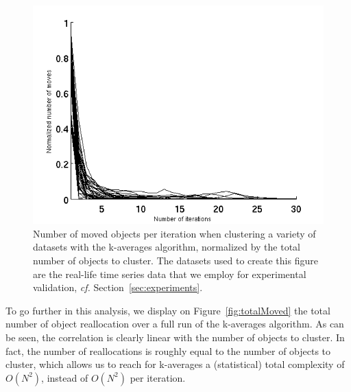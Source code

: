 \documentclass[10pt,journal,compsoc]{IEEEtran}
\begin{document}
\begin{figure}
\center
\includegraphics[width = \columnwidth]{figures/iterMove.png} 
\caption{Number of moved objects per iteration when clustering a variety of datasets with the k-averages algorithm, normalized by the total number of objects to cluster. The datasets used to create this figure are the real-life time series data that we employ for experimental validation, \textit{cf.} Section~\ref{sec:experiments}.}
\label{fig:moved}
\end{figure}

To go further in this analysis, we display on Figure~\ref{fig:totalMoved}  the total number of object reallocation over a full run of the k-averages algorithm. As can be seen, the correlation is clearly linear with the number of objects to cluster. In fact, the number of reallocations is roughly equal to the number of objects to cluster, which allows us to reach for k-averages a (statistical) total complexity of $O(N^2)$, instead of $O(N^2)$ per iteration.
\end{document}
